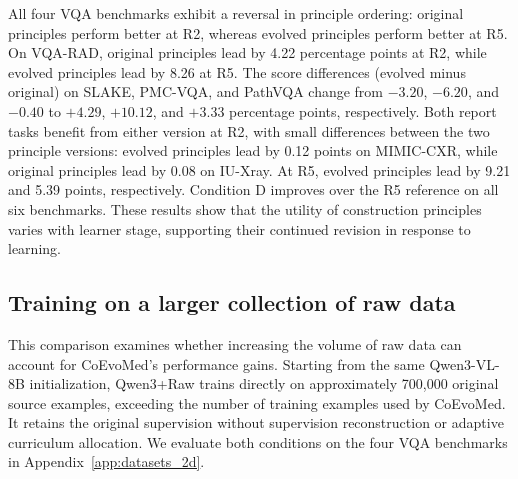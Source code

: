All four VQA benchmarks exhibit a reversal in principle ordering: original principles perform better at R2, whereas evolved principles perform better at R5. On VQA-RAD, original principles lead by 4.22 percentage points at R2, while evolved principles lead by 8.26 at R5. The score differences (evolved minus original) on SLAKE, PMC-VQA, and PathVQA change from $-3.20$, $-6.20$, and $-0.40$ to $+4.29$, $+10.12$, and $+3.33$ percentage points, respectively. Both report tasks benefit from either version at R2, with small differences between the two principle versions: evolved principles lead by 0.12 points on MIMIC-CXR, while original principles lead by 0.08 on IU-Xray. At R5, evolved principles lead by 9.21 and 5.39 points, respectively. Condition D improves over the R5 reference on all six benchmarks. These results show that the utility of construction principles varies with learner stage, supporting their continued revision in response to learning.

\subsection{Training on a larger collection of raw data}
\label{app:raw_source}

This comparison examines whether increasing the volume of raw data can account for CoEvoMed's performance gains.  Starting from the same Qwen3-VL-8B initialization, Qwen3+Raw trains directly on approximately 700,000 original source examples, exceeding the number of training examples used by CoEvoMed. It retains the original supervision without supervision reconstruction or adaptive curriculum allocation. We evaluate both conditions on the four VQA benchmarks in Appendix~\ref{app:datasets_2d}. 

